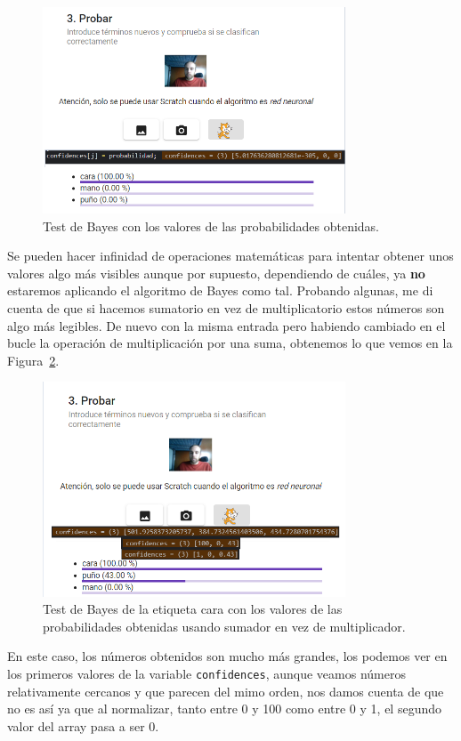 \documentclass[a4paper, 12pt]{book}
\begin{document}
\begin{figure}
	\centering
	\includegraphics[width=9cm, keepaspectratio]{img/bayestestcara}
	\caption{Test de Bayes con los valores de las probabilidades obtenidas.}			
	\label{fig:bayestestcara}
\end{figure}

Se pueden hacer infinidad de operaciones matemáticas para intentar obtener unos valores algo más visibles aunque por supuesto, dependiendo de cuáles, ya \textbf{no} estaremos aplicando el algoritmo de Bayes como tal. Probando algunas, me di cuenta de que si hacemos sumatorio en vez de multiplicatorio estos números son algo más legibles. De nuevo con la misma entrada pero habiendo cambiado en el bucle la operación de multiplicación por una suma, obtenemos lo que vemos en la Figura~\ref{fig:bayestestcarasuma}.

\begin{figure}
	\centering
	\includegraphics[width=9cm, keepaspectratio]{img/bayestestcarasuma}
	\caption{Test de Bayes de la etiqueta cara con los valores de las probabilidades obtenidas usando sumador en vez de multiplicador.}			
	\label{fig:bayestestcarasuma}
\end{figure}

En este caso, los números obtenidos son mucho más grandes, los podemos ver en los primeros valores de la variable \texttt{confidences}, aunque veamos números relativamente cercanos y que parecen del mimo orden, nos damos cuenta de que no es así ya que al normalizar, tanto entre 0 y 100 como entre 0 y 1, el segundo valor del array pasa a ser 0.
\end{document}
